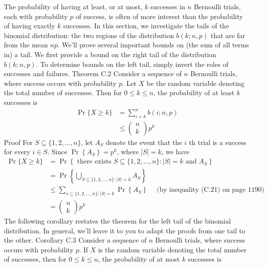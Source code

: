 \documentclass[lang=cn,newtx,10pt,scheme=chinese]{elegantbook}
\begin{document}
The probability of having at least, or at most, $k$ successes in $n$ Bernoulli trials, each with probability $p$ of success, is often of more interest than the probability of having exactly $k$ successes. In this section, we investigate the tails of the binomial distribution: the two regions of the distribution $b(k ; n, p)$ that are far from the mean $n p$. We'll prove several important bounds on (the sum of all terms in) a tail.
We first provide a bound on the right tail of the distribution $b(k ; n, p)$. To determine bounds on the left tail, simply invert the roles of successes and failures.
Theorem C.2
Consider a sequence of $n$ Bernoulli trials, where success occurs with probability $p$. Let $X$ be the random variable denoting the total number of successes. Then for $0 \leq k \leq n$, the probability of at least $k$ successes is
$$
\begin{aligned}
\operatorname{Pr}\{X \geq k\} & =\sum_{i=k}^n b(i ; n, p) \\
& \leq\left(\begin{array}{l}
n \\
k
\end{array}\right) p^k
\end{aligned}
$$
Proof For $S \subseteq\{1,2, \ldots, n\}$, let $A_S$ denote the event that the $i$ th trial is a success for every $i \in S$. Since $\operatorname{Pr}\left\{A_S\right\}=p^k$, where $|S|=k$, we have
$$
\begin{aligned}
\operatorname{Pr}\{X \geq k\} & =\operatorname{Pr}\left\{\text { there exists } S \subseteq\{1,2, \ldots, n\}:|S|=k \text { and } A_S\right\} \\
& =\operatorname{Pr}\left\{\bigcup_{S \subseteq\{1,2, \ldots, n\}:|S|=k} A_S\right\} \\
& \leq \sum_{s \subseteq\{1,2, \ldots, n\}:|S|=k} \operatorname{Pr}\left\{A_S\right\} \quad \text { (by inequality (C.21) on page 1190) } \\
& =\left(\begin{array}{l}
n \\
k
\end{array}\right) p^k
\end{aligned}
$$
The following corollary restates the theorem for the left tail of the binomial distribution. In general, we'll leave it to you to adapt the proofs from one tail to the other.
Corollary C.3
Consider a sequence of $n$ Bernoulli trials, where success occurs with probability $p$. If $X$ is the random variable denoting the total number of successes, then for $0 \leq k \leq n$, the probability of at most $k$ successes is
\end{document}
